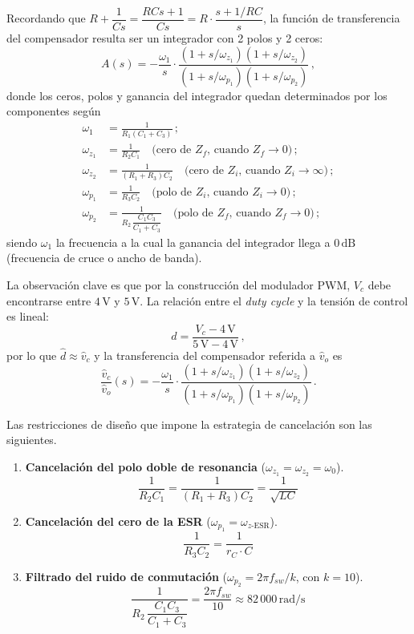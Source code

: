 Recordando que $R + \dfrac{1}{Cs} = \dfrac{RCs + 1}{Cs} = R \cdot \dfrac{s + 1/RC}{s}$, la función de transferencia del compensador resulta ser un integrador con 2 polos y 2 ceros:
\[
    A(s) = -\frac{\omega_1}{s} \cdot \frac{\left(1 + s/\omega_{z_1}\right)\left(1 + s/\omega_{z_2}\right)}{\left(1 + s/\omega_{p_1}\right)\left(1 + s/\omega_{p_2}\right)} \, ,
\]
donde los ceros, polos y ganancia del integrador quedan determinados por los componentes según
\begin{align}
    \omega_1    &= \frac{1}{R_1(C_1 + C_3)}\,;  \label{eq:w1} \\[4pt]
    \omega_{z_1} &= \frac{1}{R_2 C_1}          \quad \text{(cero de $Z_f$, cuando $Z_f \to 0$)}\,; \label{eq:wz1} \\[4pt]
    \omega_{z_2} &= \frac{1}{(R_1 + R_3)C_2}   \quad \text{(cero de $Z_i$, cuando $Z_i \to \infty$)}\,; \label{eq:wz2} \\[4pt]
    \omega_{p_1} &= \frac{1}{R_3 C_2}           \quad \text{(polo de $Z_i$, cuando $Z_i \to 0$)}\,; \label{eq:wp1} \\[4pt]
    \omega_{p_2} &= \frac{1}{R_2 \,\dfrac{C_1 C_3}{C_1 + C_3}} \quad \text{(polo de $Z_f$, cuando $Z_f \to 0$)}\,; \label{eq:wp2}
\end{align}
siendo $\omega_1$ la frecuencia a la cual la ganancia del integrador llega a $0\,\text{dB}$ (frecuencia de cruce o ancho de banda).

La observación clave es que por la construcción del modulador PWM, $V_c$ debe encontrarse entre $4\,\text{V}$ y $5\,\text{V}$. La relación entre el \textit{duty cycle} y la tensión de control es lineal:
\[
    d = \frac{V_c - 4\,\text{V}}{5\,\text{V} - 4\,\text{V}} \, ,
\]
por lo que $\hat{d} \approx \hat{v}_c$ y la transferencia del compensador referida a $\hat{v}_o$ es
\[
    \frac{\hat{v}_c}{\hat{v}_o}(s) = -\frac{\omega_1}{s} \cdot \frac{\left(1 + s/\omega_{z_1}\right)\left(1 + s/\omega_{z_2}\right)}{\left(1 + s/\omega_{p_1}\right)\left(1 + s/\omega_{p_2}\right)} \,.
\]

Las restricciones de diseño que impone la estrategia de cancelación son las siguientes.

\begin{enumerate}
    \item \textbf{Cancelación del polo doble de resonancia} ($\omega_{z_1} = \omega_{z_2} = \omega_0$).
    \[
        \frac{1}{R_2 C_1} = \frac{1}{(R_1 + R_3)C_2} = \frac{1}{\sqrt{LC}}
    \]

    \item \textbf{Cancelación del cero de la ESR} ($\omega_{p_1} = \omega_{z\text{-ESR}}$).
    \[
        \frac{1}{R_3 C_2} = \frac{1}{r_C \cdot C}
    \]

    \item \textbf{Filtrado del ruido de conmutación} ($\omega_{p_2} = 2\pi f_{sw}/k$, con $k = 10$).
    \[
        \frac{1}{R_2 \,\dfrac{C_1 C_3}{C_1 + C_3}} = \frac{2\pi f_{sw}}{10} \approx 82\,000\,\text{rad/s}
    \]
\end{enumerate}

